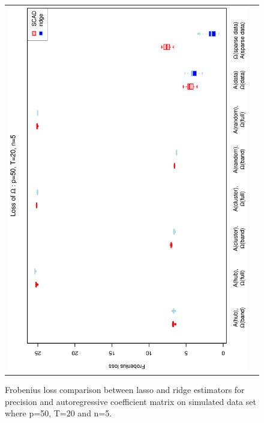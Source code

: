 \documentclass[a4paper]{article}
\begin{document}
\begin{figure}[h!]
\begin{tabular}{cc}
\includegraphics[scale=0.5,angle=270]{LossOmega50T20N5.eps}\\
\end{tabular}
\caption{Frobenius loss comparison between lasso and ridge estimators for precision and autoregressive coefficient matrix on simulated data set where p=50, T=20 and n=5.}
\label{fig:Loss50T20N5}
\end{figure}

\end{document}
